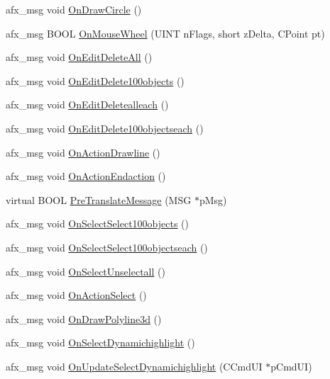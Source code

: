 \begin{DoxyCompactItemize}
\item 
afx\+\_\+msg void \hyperlink{class_c_g_launcher_view_acf0a07a6ff114c15a6c03cee99e9e7c3}{On\+Draw\+Circle} ()
\item 
afx\+\_\+msg B\+O\+O\+L \hyperlink{class_c_g_launcher_view_a15aac6179feacd9daf0e71c9c9dd7bf2}{On\+Mouse\+Wheel} (U\+I\+N\+T n\+Flags, short z\+Delta, C\+Point pt)
\item 
afx\+\_\+msg void \hyperlink{class_c_g_launcher_view_af1087394fd0832f15fa01494457c9123}{On\+Edit\+Delete\+All} ()
\item 
afx\+\_\+msg void \hyperlink{class_c_g_launcher_view_a907cae066fee4a73388a6821e5eb30d7}{On\+Edit\+Delete100objects} ()
\item 
afx\+\_\+msg void \hyperlink{class_c_g_launcher_view_aa9a548684265e4fda957a0aa3ef5db0f}{On\+Edit\+Deletealleach} ()
\item 
afx\+\_\+msg void \hyperlink{class_c_g_launcher_view_af0012d5477054fbefecdb6cf7fd54742}{On\+Edit\+Delete100objectseach} ()
\item 
afx\+\_\+msg void \hyperlink{class_c_g_launcher_view_a4afacab1ee9a1168f809a37fcf0625fd}{On\+Action\+Drawline} ()
\item 
afx\+\_\+msg void \hyperlink{class_c_g_launcher_view_a8af00818b62964c8a439f94116ffb3c8}{On\+Action\+Endaction} ()
\item 
virtual B\+O\+O\+L \hyperlink{class_c_g_launcher_view_af1cf43ceb6b046b072ac37df0bb1b191}{Pre\+Translate\+Message} (M\+S\+G $\ast$p\+Msg)
\item 
afx\+\_\+msg void \hyperlink{class_c_g_launcher_view_ab1c77cbde28862c312f1f25e78ef230e}{On\+Select\+Select100objects} ()
\item 
afx\+\_\+msg void \hyperlink{class_c_g_launcher_view_a827c3ed8683f6c4afee478d463374bc1}{On\+Select\+Select100objectseach} ()
\item 
afx\+\_\+msg void \hyperlink{class_c_g_launcher_view_a6887091a1b8286fe7a50b4335a6f2f87}{On\+Select\+Unselectall} ()
\item 
afx\+\_\+msg void \hyperlink{class_c_g_launcher_view_ae6e662b662f04b6dfb1b2c875b25d180}{On\+Action\+Select} ()
\item 
afx\+\_\+msg void \hyperlink{class_c_g_launcher_view_af59537b8afcbcc5c4d0ed4a254b4025e}{On\+Draw\+Polyline3d} ()
\item 
afx\+\_\+msg void \hyperlink{class_c_g_launcher_view_a798b1f80dee3fe512520e8b12362a293}{On\+Select\+Dynamichighlight} ()
\item 
afx\+\_\+msg void \hyperlink{class_c_g_launcher_view_a2ea1c2773e5896f684d959fd7362f555}{On\+Update\+Select\+Dynamichighlight} (C\+Cmd\+U\+I $\ast$p\+Cmd\+U\+I)

\end{DoxyCompactItemize}
